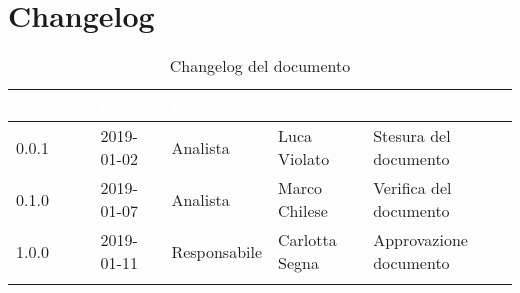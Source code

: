 \newpage

\section{Changelog}

\begin{center}
\begin{longtable}[c]{|m{}|m{}|m{}|m{}|p{}|}
\hline
\rowcolor{bluelogo}\textbf{\textcolor{white}{Versione}} & \textbf{\textcolor{white}{Data}} & \textbf{\textcolor{white}{Ruolo}} & \textbf{\textcolor{white}{Autore}} & \textbf{\textcolor{white}{Descrizione}}\\
\hline \hline
\endfirsthead
0.0.1 & 2019-01-02 & Analista & Luca Violato & Stesura del documento \\
\hline
\rowcolor{grigio}0.1.0 & 2019-01-07 & Analista & Marco Chilese & Verifica del documento \\
\hline
1.0.0 & 2019-01-11 & Responsabile & Carlotta Segna & Approvazione documento \\
\hline
\caption{Changelog del documento}
\end{longtable}
\end{center}
